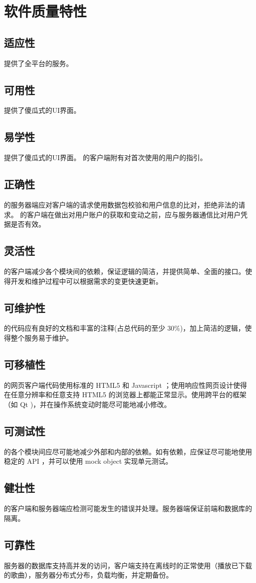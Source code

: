 \chapter{软件质量特性}

\section {适应性}
\proname 提供了全平台的服务。

\section {可用性}
\proname 提供了傻瓜式的UI界面。

\section {易学性}
\proname 提供了傻瓜式的UI界面。 \proname 的客户端附有对首次使用的用户的指引。

\section {正确性}
\proname 的服务器端应对客户端的请求使用数据包校验和用户信息的比对，拒绝非法的请求。
\proname 的客户端在做出对用户账户的获取和变动之前，应与服务器通信比对用户凭据是否有效。

\section {灵活性}
\proname 的客户端减少各个模块间的依赖，保证逻辑的简洁，并提供简单、全面的接口。使得开发和维护过程中可以根据需求的变更快速更新。

\section {可维护性}
\proname 的代码应有良好的文档和丰富的注释(占总代码的至少 30\%)，加上简洁的逻辑，使得整个服务易于维护。

\section {可移植性}
\proname 的网页客户端代码使用标准的 HTML5 和 Javascript  ；使用响应性网页设计使得在任意分辨率和任意支持 HTML5 的浏览器上都能正常显示。使用跨平台的框架（如 Qt )，并在操作系统变动时能尽可能地减小修改。

\section {可测试性}
\proname 的各个模块间应尽可能地减少外部和内部的依赖。如有依赖，应保证尽可能地使用稳定的 API ，并可以使用 mock object 实现单元测试。

\section {健壮性}
\proname 的客户端和服务器端应检测可能发生的错误并处理。服务器端保证前端和数据库的隔离。

\section {可靠性}
\proname 服务器的数据库支持高并发的访问，客户端支持在离线时的正常使用（播放已下载的歌曲），服务器分布式分布，负载均衡，并定期备份。

